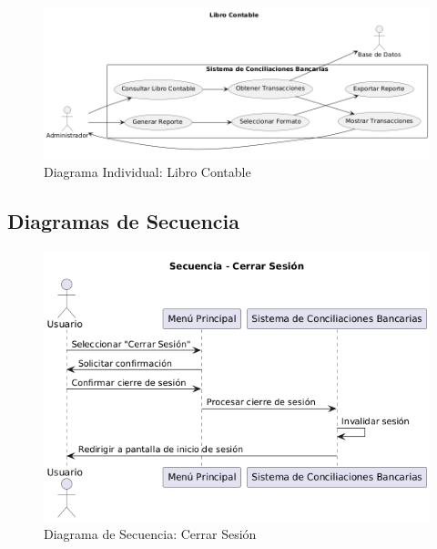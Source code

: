 \documentclass{article}
\begin{document}
\begin{figure}[H]
    \centering
    \includegraphics[width=\textwidth]{casos/LibroContable.png}
    \caption{Diagrama Individual: Libro Contable}
\end{figure}

\newpage
\subsection{Diagramas de Secuencia}
\begin{figure}[H]
    \centering
    \includegraphics[width=\textwidth]{secuencia/CerrarSesion.png}
    \caption{Diagrama de Secuencia: Cerrar Sesión}
\end{figure}
\end{document}
